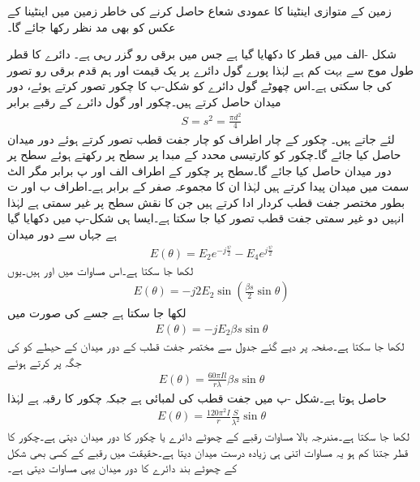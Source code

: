 زمین کے متوازی اینٹینا کا عمودی شعاع حاصل کرنے کی خاطر زمین میں اینٹینا کے عکس کو بھی مد نظر رکھا جائے گا۔

شکل -الف میں  قطر کا  دکھایا گیا ہے جس میں  برقی رو گزر رہی ہے۔ دائرے کا قطر طول موج سے بہت کم  ہے لہٰذا پورے گول دائرے پر یک قیمت اور ہم قدم برقی رو تصور کی جا سکتی ہے۔اس چھوٹے گول دائرے کو شکل-ب کا چکور تصور کرتے ہوئے، دور میدان حاصل کرتے ہیں۔چکور اور گول دائرے کے رقبے  برابر
\begin{align}
S=s^2=\frac{\pi d^2}{4} 
\end{align}
لئے جاتے ہیں۔ چکور کے چار اطراف کو چار جفت قطب تصور کرتے ہوئے دور میدان حاصل کیا جائے گا۔چکور کو کارتیسی محدد کے مبدا پر  سطح پر رکھتے ہوئے  سطح پر دور میدان حاصل کیا جائے گا۔سطح  پر چکور کے اطراف الف اور پ برابر مگر الٹ سمت میں میدان پیدا کرتے ہیں لہٰذا ان کا مجموعہ صفر کے برابر ہے۔اطراف ب اور ت بطور مختصر جفت قطب کردار ادا کرتے ہیں جن کا نقش  سطح پر غیر سمتی ہے لہٰذا انہیں دو غیر سمتی جفت قطب تصور کیا جا سکتا ہے۔ایسا ہی شکل-پ میں دکھایا گیا ہے جہاں سے دور میدان
\begin{align*}
E(\theta)=E_2 e^{-j\frac{\psi}{2}}-E_4e^{j\frac{\psi}{2}}
\end{align*}
لکھا جا سکتا ہے۔اس مساوات میں  اور  ہیں۔یوں
\begin{align*}
E(\theta)=-j 2 E_2 \sin\left(\frac{\beta s}{2}\sin \theta \right) 
\end{align*}
لکھا جا سکتا ہے جسے  کی صورت میں
\begin{align}
E(\theta)=-j E_2 \beta s \sin \theta
\end{align}
لکھا جا سکتا ہے۔صفحہ  پر دیے گئے جدول  سے مختصر جفت قطب کے دور میدان  کے حیطے کو  کی جگہ پر کرتے ہوئے
\begin{align}
E(\theta)=\frac{60 \pi I l}{r \lambda} \beta s \sin \theta
\end{align}
حاصل ہوتا ہے۔شکل -پ میں جفت قطب کی لمبائی  ہے جبکہ چکور کا رقبہ  ہے لہٰذا
\begin{align}
E(\theta)=\frac{120 \pi^2 I}{r} \frac{S}{\lambda^2}\sin \theta
\end{align}
لکھا جا سکتا ہے۔مندرجہ بالا مساوات  رقبے کے چھوٹے دائرے یا چکور کا دور میدان دیتی ہے۔چکور کا قطر جتنا کم ہو یہ مساوات اتنی ہی زیادہ درست میدان دیتا ہے۔حقیقت میں  رقبے کے کسی بھی شکل کے چھوٹے بند دائرے کا دور میدان یہی مساوات دیتی ہے۔  


